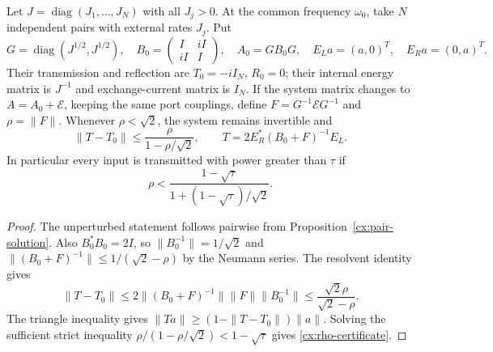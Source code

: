 \begin{theorem}
\label{cx:n-model}
Let $J=\operatorname{diag}(J_1,\ldots,J_N)$ with all $J_j>0$. At the
common frequency $\omega_0$, take $N$ independent pairs with external
rates $J_j$. Put
\begin{equation}
 G=\operatorname{diag}(J^{1/2},J^{1/2}),\quad
 B_0=\begin{pmatrix}I&iI\\iI&I\end{pmatrix},\quad
 A_0=GB_0G,\quad
 E_L a=(a,0)^T,\quad E_R a=(0,a)^T.
 \label{cx:weighted-matrices}
\end{equation}
Their transmission and reflection are $T_0=-iI_N$, $R_0=0$; their
internal energy matrix is $J^{-1}$ and exchange-current matrix is $I_N$.
If the system matrix changes to $A=A_0+\mathcal E$, keeping the same
port couplings, define
$F=G^{-1}\mathcal E G^{-1}$ and $\rho=\|F\|$. Whenever
$\rho<\sqrt2$, the system remains invertible and
\begin{equation}
 \|T-T_0\|\leq\frac{\rho}{1-\rho/\sqrt2},\qquad
 T=2E_R^*(B_0+F)^{-1}E_L.
 \label{cx:weighted-error}
\end{equation}
In particular every input is transmitted with power greater than
$\tau$ if
\begin{equation}
 \rho<\frac{1-\sqrt\tau}{1+(1-\sqrt\tau)/\sqrt2}.
 \label{cx:rho-certificate}
\end{equation}
\end{theorem}

\begin{proof}
The unperturbed statement follows pairwise from
Proposition~\ref{cx:pair-solution}. Also $B_0^*B_0=2I$, so
$\|B_0^{-1}\|=1/\sqrt2$ and
$\|(B_0+F)^{-1}\|\leq1/(\sqrt2-\rho)$ by the Neumann series.
The resolvent identity gives
\begin{equation}
 \|T-T_0\|
 \leq2\|(B_0+F)^{-1}\|\|F\|\|B_0^{-1}\|
 \leq\frac{\sqrt2\rho}{\sqrt2-\rho}.
 \label{cx:resolvent-proof}
\end{equation}
The triangle inequality gives $\|Ta\|\geq(1-\|T-T_0\|)\|a\|$.
Solving the sufficient strict inequality
$\rho/(1-\rho/\sqrt2)<1-\sqrt\tau$ gives
\eqref{cx:rho-certificate}.
\end{proof}

